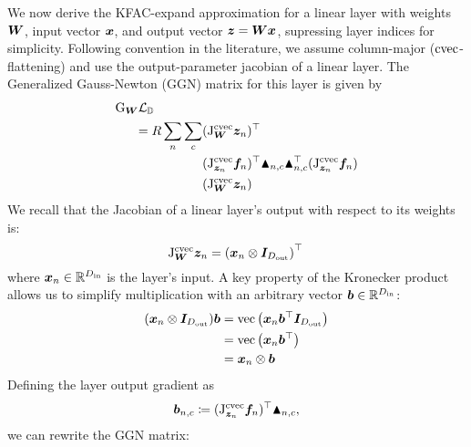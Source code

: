 We now derive the KFAC-expand approximation for a linear layer with weights ${\bm{W}}$, input vector ${\bm{x}}$, and output vector ${\bm{z}} = {\bm{W}}{\bm{x}}$, supressing layer indices for simplicity. Following convention in the literature, we assume column-major ($\operatorname{cvec}$-flattening) and use the output-parameter jacobian of a linear layer. The Generalized Gauss-Newton (GGN) matrix for this layer is given by
\begin{align*}
  \mathrm{G}_{{\bm{W}}} &{\mathcal{L}}_{{\mathbb{D}}} \\
  &\begin{aligned}=
    R \sum_n \sum_c &(\mathrm{J}^{\operatorname{cvec}}_{{\bm{W}}}{\bm{z}}_n)^{\top} \\
    &(\mathrm{J}^{\operatorname{cvec}}_{{\bm{z}}_n}{\bm{f}}_n)^{\top}
    \blacktriangle_{n,c} \blacktriangle_{n,c}^{\top}
    (\mathrm{J}^{\operatorname{cvec}}_{{\bm{z}}_n}{\bm{f}}_n) \\
    &(\mathrm{J}^{\operatorname{cvec}}_{{\bm{W}}}{\bm{z}}_n)
  \end{aligned}
\end{align*}
We recall that the Jacobian of a linear layer's output with respect to its weights is:
$$ \mathrm{J}^{\operatorname{cvec}}_{{\bm{W}}}{\bm{z}}_n = \left({\bm{x}}_n \otimes {\bm{I}}_{D_{\text{out}}}\right)^{\top}\, $$
where ${\bm{x}}_n \in \mathbb{R}^{D_\text{in}}$ is the layer's input.
A key property of the Kronecker product allows us to simplify multiplication with an arbitrary vector ${\bm{b}} \in {\mathbb{R}}^{D_{\text{in}}}$:
\begin{align*}
  ({\bm{x}}_n \otimes {\bm{I}}_{D_{\text{out}}}) {\bm{b}} &= \text{vec}\left({\bm{x}}_n {\bm{b}}^{\top}{\bm{I}}_{D_{\text{out}}}\right) \\
  &= \text{vec}\left( {\bm{x}}_n {\bm{b}}^{\top} \right) \\
  &= {\bm{x}}_n \otimes {\bm{b}}
\end{align*}
Defining the layer output gradient as $${\bm{b}}_{n,c} \coloneq (\mathrm{J}^{\operatorname{cvec}}_{{\bm{z}}_n}{\bm{f}}_n)^{\top} \blacktriangle_{n,c},$$ we can rewrite the GGN matrix:
